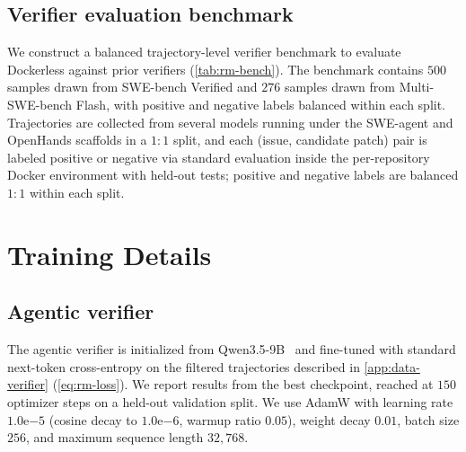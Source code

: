 \documentclass[]{arxiv_template}
\newcommand{\approach}{Dockerless\xspace}
\newcommand{\todo}[1]{\textcolor{red}{[TODO: #1]}}
\newcommand{\zeng}[1]{\textcolor[rgb]{1,0.66,0}{\textbf{[Zeng: #1]}}}
\begin{document}
\subsection{Verifier evaluation benchmark}
\label{app:rm-bench}

We construct a balanced trajectory-level verifier benchmark to evaluate \approach against prior verifiers (\cref{tab:rm-bench}).
The benchmark contains $500$ samples drawn from SWE-bench Verified and $276$ samples drawn from Multi-SWE-bench Flash, with positive and negative labels balanced within each split.
Trajectories are collected from several models running under the SWE-agent and OpenHands scaffolds in a $1{:}1$ split, and each (issue, candidate patch) pair is labeled positive or negative via standard evaluation inside the per-repository Docker environment with held-out tests; positive and negative labels are balanced $1{:}1$ within each split.


\section{Training Details}
\label{app:training}


\subsection{Agentic verifier}
\label{app:training-verifier}

The agentic verifier is initialized from Qwen3.5-9B~\citep{team2026qwen35} and fine-tuned with standard next-token cross-entropy on the filtered trajectories described in \cref{app:data-verifier} (\cref{eq:rm-loss}).
We report results from the best checkpoint, reached at $150$ optimizer steps on a held-out validation split.
We use AdamW with learning rate $1.0\mathrm{e}{-5}$ (cosine decay to $1.0\mathrm{e}{-6}$, warmup ratio $0.05$), weight decay $0.01$, batch size $256$, and maximum sequence length $32{,}768$.
\end{document}
